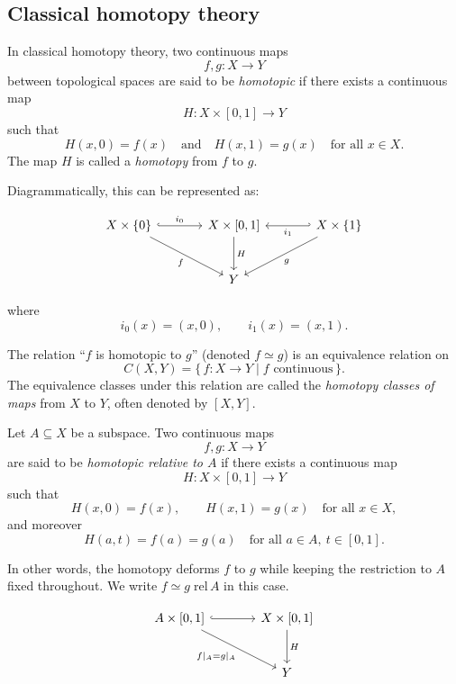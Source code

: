 \documentclass[11pt]{article}
\theoremstyle{definition}
\theoremstyle{plain}
\begin{document}
\subsection{Classical homotopy theory}
In classical homotopy theory, two continuous maps
\[
    f,g : X \to Y
\]
between topological spaces are said to be \emph{homotopic} if there exists a continuous map
\[
    H : X \times [0,1] \to Y
\]
such that
\[
    H(x,0) = f(x) \quad \text{and} \quad H(x,1) = g(x) \quad \text{for all } x \in X.
\]
The map $H$ is called a \emph{homotopy} from $f$ to $g$.

Diagrammatically, this can be represented as:

\[
    \begin{tikzcd}[row sep=large, column sep=large]
        X \times \{0\} \arrow[r,hook,"i_0"] \arrow[dr,"f"'] &
        X \times [0,1] \arrow[d,"H"] &
        X \times \{1\} \arrow[l,hook',"i_1"] \arrow[dl,"g"] \\
        & Y &
    \end{tikzcd}
\]

where
\[
    i_0(x) = (x,0), \qquad i_1(x) = (x,1).
\]




The relation ``$f$ is homotopic to $g$'' (denoted $f \simeq g$) is an equivalence relation on
\[
    C(X,Y) = \{\, f : X \to Y \mid f \text{ continuous} \,\}.
\]
The equivalence classes under this relation are called the \emph{homotopy classes of maps} from $X$ to $Y$, often denoted by $[X,Y]$.



Let $A \subseteq X$ be a subspace. Two continuous maps
\[
    f,g : X \to Y
\]
are said to be \emph{homotopic relative to $A$} if there exists a continuous map
\[
    H : X \times [0,1] \to Y
\]
such that
\[
    H(x,0) = f(x), \qquad H(x,1) = g(x) \quad \text{for all } x \in X,
\]
and moreover
\[
    H(a,t) = f(a) = g(a) \quad \text{for all } a \in A, \ t \in [0,1].
\]

In other words, the homotopy deforms $f$ to $g$ while keeping the restriction to $A$ fixed throughout.
We write $f \simeq g \; \mathrm{rel}\, A$ in this case.


\[
    \begin{tikzcd}[row sep=large, column sep=large]
        A \times [0,1] \arrow[r,hook] \arrow[dr,"f|_A = g|_A"'] &
        X \times [0,1] \arrow[d,"H"] \\
        & Y
    \end{tikzcd}
\]
\end{document}
